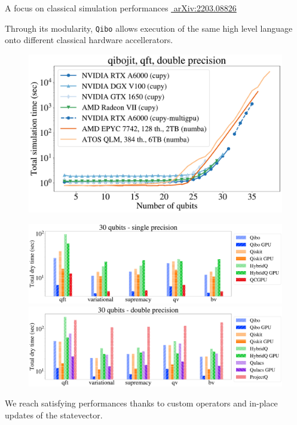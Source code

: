 \documentclass[aspectratio=169, 8pt, xcolor={svgnames}, hyperref={linkcolor=black}]{beamer}
\begin{document}
\begin{frame}{A focus on classical simulation performances \hfill \href{https://arxiv.org/abs/2203.08826}{\faBook\,\,arXiv:2203.08826}}

Through its modularity, \texttt{Qibo} allows execution of the same high level language onto 
different classical hardware accellerators.
\begin{multicols}{2}
   \begin{figure}
     \includegraphics[width=1.\linewidth]{figures/devices_qft_total_simulation_time_double.pdf} 
   \end{figure} 
   \begin{figure}
     \includegraphics[width=1.\linewidth]{figures/libraries_single_30qubits_total_dry_time.pdf} 
     \includegraphics[width=1.\linewidth]{figures/libraries_double_30qubits_total_dry_time.pdf} 
   \end{figure}
\end{multicols}
We reach satisfying performances thanks to custom operators and in-place updates of the statevector.

\end{frame}
\end{document}
